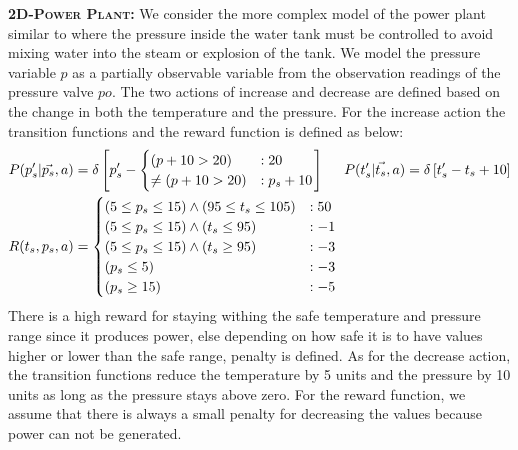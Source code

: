 \documentclass{article} %
\begin{document}
{\bf \textsc{2D-Power Plant}:} We consider the more complex model of the power plant similar to \cite{steam2} where the pressure inside the water tank must be controlled to avoid mixing water into the steam or explosion of the tank. We model the pressure variable $p$ as a partially observable variable from the observation readings of the pressure valve $po$. The two actions of increase and decrease are defined based on the change in both the temperature and the pressure. For the increase action the transition functions and the reward function is defined as below: 
{\footnotesize
\begin{align}
P(p_s'|\vec{p_s},a)&= \delta\left[ p_s' - 
\begin{cases}
 (p+10> 20) &: 20 \\ 
\neq (p+10> 20) &: p_s + 10 \\
\end{cases}
\right]\nonumber
\hspace{5mm} 
P(t_s'|\vec{t_s},a)= \delta\left[ t_s' -  t_s +10 \right]\nonumber
\\
R(t_s,p_s,a) &= 
\begin{cases}
(5 \leq p_s \leq 15)\wedge (95 \leq t_s \leq 105)&:50\\
(5 \leq p_s \leq 15)\wedge (t_s \leq 95)&: -1\\
(5 \leq p_s \leq 15)\wedge (t_s \geq 95)&: -3\\				
(p_s \leq 5) &: -3\\						
(p_s \geq 15) &: -5\\ 
\end{cases}\nonumber
\end{align}
}
There is a high reward for staying withing the safe temperature and pressure range since it produces power, else depending on how safe it is to have values higher or lower than the safe range, penalty is defined.
As for the decrease action, the transition functions reduce the temperature by 5 units and the pressure by 10 units as long as the pressure stays above zero. For the reward function, we assume that there is always a small penalty for decreasing the values because power can not be generated. 
\end{document}
